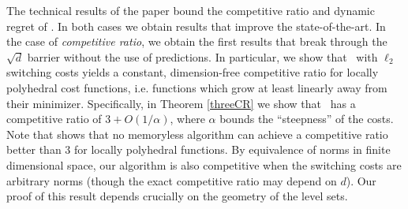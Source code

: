 The technical results of the paper bound the competitive ratio and dynamic regret of \ourack.  In both cases we obtain results that improve the state-of-the-art. In the case of \emph{competitive ratio}, we obtain the first results that break through the $\sqrt{d}$ barrier without the use of predictions.  In particular, we show that \ourack\ with $\ell_2$ switching costs yields a constant, dimension-free competitive ratio for locally polyhedral cost functions, i.e. functions which grow at least linearly away from their minimizer.  Specifically, in Theorem \ref{threeCR} we show that \ourack\ has a competitive ratio of $3+O(1/\alpha)$, where $\alpha$ bounds the ``steepness'' of the costs.  Note that \cite{bansal2015} shows that no memoryless algorithm can achieve a competitive ratio better than $3$ for locally polyhedral functions. 
By equivalence of norms in finite dimensional space, our algorithm is also competitive when the switching costs are arbitrary norms (though the exact competitive ratio may depend on $d$).  Our proof of this result depends crucially on the geometry of the level sets. 

  

